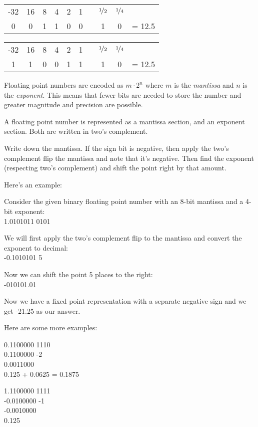 \documentclass[../main.tex]{subfile}
\begin{document}
\begin{tabular}{cccccccccc}
	-32 & 16 & 8 & 4 & 2 & 1 & \cdot & $\nicefrac{1}{2}$ & $\nicefrac{1}{4}$ &\\
	0 & 0 & 1 & 1 & 0 & 0 & \cdot & 1 & 0 & = 12.5
\end{tabular}

\begin{tabular}{cccccccccc}
	-32 & 16 & 8 & 4 & 2 & 1 & \cdot & $\nicefrac{1}{2}$ & $\nicefrac{1}{4}$ &\\
	1 & 1 & 0 & 0 & 1 & 1 & \cdot & 1 & 0 & = 12.5
\end{tabular}


Floating point numbers are encoded as $m \cdot 2^n$ where $m$ is the \textit{mantissa} and $n$ is the \textit{exponent}. This means that fewer bits are needed to store the number and greater magnitude and precision are possible.

A floating point number is represented as a mantissa section, and an exponent section. Both are written in two's complement.


Write down the mantissa. If the sign bit is negative, then apply the two's complement flip the mantissa and note that it's negative. Then find the exponent (respecting two's complement) and shift the point right by that amount.

Here's an example:

Consider the given binary floating point number with an 8-bit mantissa and a 4-bit exponent:\\
1.0101011 0101

We will first apply the two's complement flip to the mantissa and convert the exponent to decimal:\\
-0.1010101 5

Now we can shift the point 5 places to the right:\\
-010101.01

Now we have a fixed point representation with a separate negative sign and we get -21.25 as our answer.

Here are some more examples:

0.1100000 1110\\
0.1100000 -2\\
0.0011000\\
0.125 + 0.0625 = 0.1875

1.1100000 1111\\
-0.0100000 -1\\
-0.0010000\\
0.125
\end{document}
